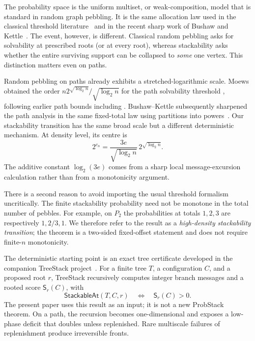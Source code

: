 \documentclass[11pt]{article}
\newcommand{\score}{\mathsf S}
\newcommand{\StackableAt}{\mathsf{StackableAt}}
\begin{document}
The probability space is the uniform multiset, or weak-composition, model that
is standard in random graph pebbling.  It is the same allocation law used in
the classical threshold literature~\cite{CzygrinowEtAl2002,BekmetjevEtAl2003}
and in the recent sharp work of Bushaw and Kettle~\cite{BushawKettle2025}.
The event, however, is different.  Classical random pebbling asks for
solvability at prescribed roots (or at every root), whereas stackability asks
whether the entire surviving support can be collapsed to \emph{some} one
vertex.  This distinction matters even on paths.

Random pebbling on paths already exhibits a stretched-logarithmic scale.
Moews obtained the order
$n2^{\sqrt{\log_2 n}}/\sqrt{\log_2 n}$ for the path solvability threshold
\cite{Moews2019}, following earlier path bounds including
\cite{WiermanEtAl2004,CzygrinowHurlbert2008}.  Bushaw--Kettle subsequently
sharpened the path analysis in the same fixed-total law using partitions into
powers~\cite{BushawKettle2025}.  Our stackability transition has the same
broad scale but a different deterministic mechanism.  At density level, its centre is
\[
 2^{c_n}=\frac{3e}{\sqrt{\log_2 n}}\,2^{\sqrt{\log_2 n}}.
\]
The additive constant $\log_2(3e)$ comes from a sharp local message-excursion
calculation rather than from a monotonicity argument.

There is a second reason to avoid importing the usual threshold formalism
uncritically.  The finite stackability probability need not be monotone in the
total number of pebbles.  For example, on $P_2$ the probabilities at totals
$1,2,3$ are respectively $1,2/3,1$.  We therefore refer to the result as a
\emph{high-density stackability transition}; the theorem is a two-sided
fixed-offset statement and does not require finite-$n$ monotonicity.

The deterministic starting point is an exact tree certificate developed in
the companion TreeStack project~\cite{TreeStack2026}.  For a finite tree $T$,
a configuration $C$, and a proposed root $r$, TreeStack recursively computes
integer branch messages and a rooted score $\score_r(C)$, with
\[
 \StackableAt(T,C,r)\quad\Longleftrightarrow\quad \score_r(C)>0.
 \tag{1.1}\label{eq:treestack-criterion}
\]
The present paper uses this result as an input; it is not a new ProbStack
theorem.  On a path, the recursion becomes one-dimensional and exposes a
low-phase deficit that doubles unless replenished.  Rare multiscale failures of
replenishment produce irreversible fronts.
\end{document}

